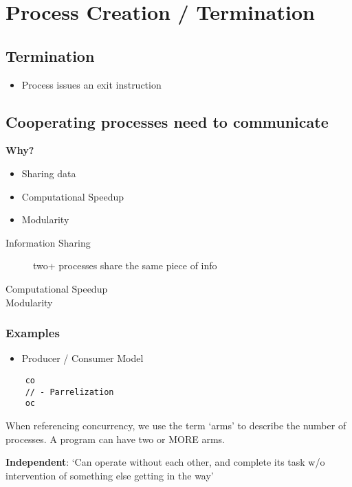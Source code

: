 \documentclass{article}
\begin{document}
\section*{Process Creation / Termination}

\subsection*{Termination}

\begin{itemize}
    \item Process issues an exit instruction
\end{itemize}

\subsection*{Cooperating processes need to communicate}
\textbf{Why?}
\begin{itemize}
    \item Sharing data
    \item Computational Speedup
    \item Modularity
\end{itemize}

\begin{description}
    \item[Information Sharing] two+ processes share the same piece of info
    \item[Computational Speedup]
    \item[Modularity]
\end{description}

\subsubsection*{Examples}
\begin{itemize}
    \item Producer / Consumer Model
\end{itemize}

\begin{verbatim}
    co
    // - Parrelization
    oc
\end{verbatim}

When referencing concurrency, we use the term `arms' to describe the number of
processes. A program can have two or MORE arms.

\textbf{Independent}: `Can operate without each other, and complete its task w/o
intervention of something else getting in the way'
\end{document}
